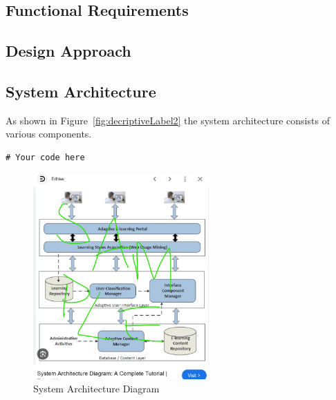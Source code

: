 \subsection{Functional Requirements}

\subsection{Design Approach}

\subsection{System Architecture}
As shown in Figure~\ref{fig:decriptiveLabel2} the system architecture consists of various components.

\begin{lstlisting}[style=cstyle, caption=System Architecture Code Example, label=lst:SystemArchitecture2]
# Your code here
\end{lstlisting}

\begin{figure}%
    \centering
    \includegraphics[width=0.6\textwidth]{figures/results/system_architecture.jpg}
    \caption{System Architecture Diagram}
    \label{fig:system-architecture24}
\end{figure}
